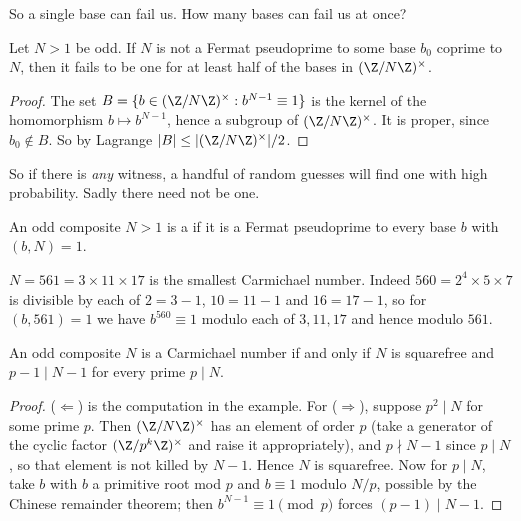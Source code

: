 So a single base can fail us. How many bases can fail us at once?

\begin{proposition}\label{prop:halfbases}
	Let $N > 1$ be odd. If $N$ is not a Fermat pseudoprime to some base $b_0$ coprime to $N$, then it fails to be one for at least half of the bases in $(\Z/N\Z)^\times$.
\end{proposition}
\begin{proof}
	The set $B = \{b \in (\Z/N\Z)^\times : b^{N-1} \equiv 1\}$ is the kernel of the homomorphism $b \mapsto b^{N-1}$, hence a subgroup of $(\Z/N\Z)^\times$. It is proper, since $b_0 \notin B$. So by Lagrange $|B| \leq |(\Z/N\Z)^\times|/2$.
\end{proof}

So if there is \emph{any} witness, a handful of random guesses will find one with high probability. Sadly there need not be one.

\begin{definition}
	An odd composite $N > 1$ is a  if it is a Fermat pseudoprime to every base $b$ with $(b,N) = 1$.
\end{definition}

\begin{example}
	$N = 561 = 3\times11\times17$ is the smallest Carmichael number. Indeed $560 = 2^4\times5\times7$ is divisible by each of $2 = 3-1$, $10 = 11-1$ and $16 = 17-1$, so for $(b, 561) = 1$ we have $b^{560}\equiv1$ modulo each of $3, 11, 17$ and hence modulo $561$.
\end{example}

\begin{proposition}
	An odd composite $N$ is a Carmichael number if and only if $N$ is squarefree and $p - 1 \mid N - 1$ for every prime $p \mid N$.
\end{proposition}
\begin{proof}
	($\Leftarrow$) is the computation in the example. For ($\Rightarrow$), suppose $p^2 \mid N$ for some prime $p$. Then $(\Z/N\Z)^\times$ has an element of order $p$ (take a generator of the cyclic factor $(\Z/p^k\Z)^\times$ and raise it appropriately), and $p \nmid N - 1$ since $p \mid N$, so that element is not killed by $N - 1$. Hence $N$ is squarefree. Now for $p \mid N$, take $b$ with $b$ a primitive root mod $p$ and $b \equiv 1$ modulo $N/p$, possible by the Chinese remainder theorem; then $b^{N-1}\equiv1 \pmod p$ forces $(p-1) \mid N - 1$.
\end{proof}

